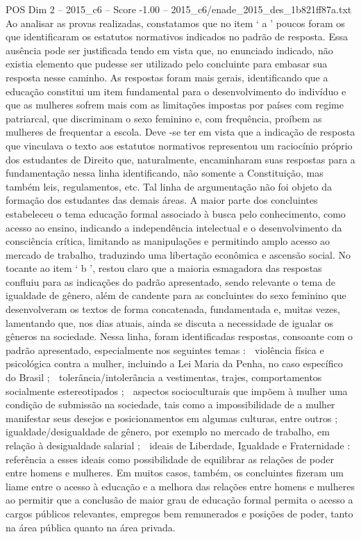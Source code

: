 \begin{textsample}{POS Dim 2 – 2015\_c6 – Score -1.00 – 2015\_c6/enade\_2015\_des\_1b821ff87a.txt}
Ao analisar as provas realizadas, constatamos que no item ‘ a ’ poucos foram os que identificaram os estatutos normativos indicados no padrão de resposta.
Essa ausência pode ser justificada tendo em vista que, no enunciado indicado, não existia elemento que pudesse ser utilizado pelo concluinte para embasar sua resposta nesse caminho.
As respostas foram mais gerais, identificando que a educação constitui um item fundamental para o desenvolvimento do indivíduo e que as mulheres sofrem mais com as limitações impostas por países com regime patriarcal, que discriminam o sexo feminino e, com frequência, proíbem as mulheres de frequentar a escola.
Deve -se ter em vista que a indicação de resposta que vinculava o texto aos estatutos normativos representou um raciocínio próprio dos estudantes de Direito que, naturalmente, encaminharam suas respostas para a fundamentação nessa linha identificando, não somente a Constituição, mas também leis, regulamentos, etc.
Tal linha de argumentação não foi objeto da formação dos estudantes das demais áreas.
A maior parte dos concluintes estabeleceu o tema educação formal associado à busca pelo conhecimento, como acesso ao ensino, indicando a independência intelectual e o desenvolvimento da consciência crítica, limitando as manipulações e permitindo amplo acesso ao mercado de trabalho, traduzindo uma libertação econômica e ascensão social.
No tocante ao item ‘ b ’, restou claro que a maioria esmagadora das respostas confluiu para as indicações do padrão apresentado, sendo relevante o tema de igualdade de gênero, além de candente para as concluintes do sexo feminino que desenvolveram os textos de forma concatenada, fundamentada e, muitas vezes, lamentando que, nos dias atuais, ainda se discuta a necessidade de igualar os gêneros na sociedade.
Nessa linha, foram identificadas respostas, consoante com o padrão apresentado, especialmente nos seguintes temas :  violência física e psicológica contra a mulher, incluindo a Lei Maria da Penha, no caso específico do Brasil ;  tolerância/intolerância a vestimentas, trajes, comportamentos socialmente estereotipados ;  aspectos socioculturais que impõem à mulher uma condição de submissão na sociedade, tais como a impossibilidade de a mulher manifestar seus desejos e posicionamentos em algumas culturas, entre outros ;  igualdade/desigualdade de gênero, por exemplo no mercado de trabalho, em relação à desigualdade salarial ;  ideais de Liberdade, Igualdade e Fraternidade : referência a esses ideais como possibilidade de equilibrar as relações de poder entre homens e mulheres.
Em muitos casos, também, os concluintes fizeram um liame entre o acesso à educação e a melhora das relações entre homens e mulheres ao permitir que a conclusão de maior grau de educação formal permita o acesso a cargos públicos relevantes, empregos bem remunerados e posições de poder, tanto na área pública quanto na área privada.

\end{textsample}
